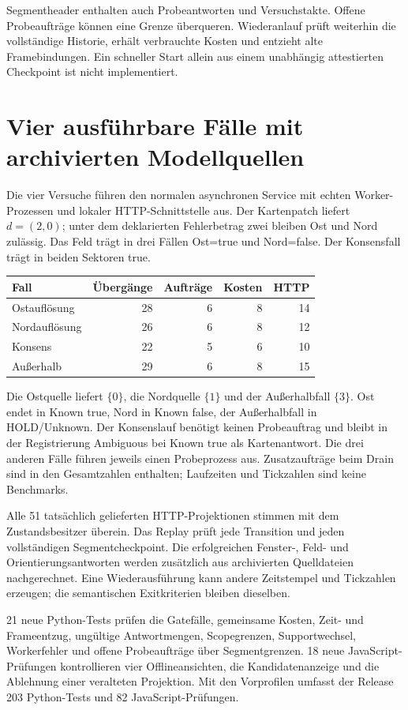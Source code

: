 \documentclass[11pt,a4paper]{article}
\newcommand{\nextsection}[2]{\clearpage{\color{accent}\small\textsf{#1}}\section{#2}}
\begin{document}
Segmentheader enthalten auch Probeantworten und Versuchstakte.
Offene Probeaufträge können eine Grenze überqueren. Wiederanlauf
prüft weiterhin die vollständige Historie, erhält verbrauchte Kosten
und entzieht alte Framebindungen. Ein schneller Start allein aus
einem unabhängig attestierten Checkpoint ist nicht implementiert.

\nextsection{49 / NACHWEIS}{Vier ausführbare Fälle mit archivierten Modellquellen}
Die vier Versuche führen den normalen asynchronen Service mit echten
Worker-Prozessen und lokaler HTTP-Schnittstelle aus. Der Kartenpatch
liefert $d=(2,0)$; unter dem deklarierten Fehlerbetrag zwei bleiben
Ost und Nord zulässig. Das Feld trägt in drei Fällen Ost=true und
Nord=false. Der Konsensfall trägt in beiden Sektoren true.

\begin{center}\begin{tabular}{@{}lrrrr@{}}\toprule
Fall & Übergänge & Aufträge & Kosten & HTTP\\\midrule
Ostauflösung & 28 & 6 & 8 & 14\\
Nordauflösung & 26 & 6 & 8 & 12\\
Konsens & 22 & 5 & 6 & 10\\
Außerhalb & 29 & 6 & 8 & 15\\\bottomrule
\end{tabular}\end{center}

Die Ostquelle liefert $\{0\}$, die Nordquelle $\{1\}$ und der
Außerhalbfall $\{3\}$. Ost endet in Known true, Nord in Known false,
der Außerhalbfall in HOLD/Unknown. Der Konsenslauf benötigt keinen
Probeauftrag und bleibt in der Registrierung Ambiguous bei
Known true als Kartenantwort. Die drei anderen Fälle führen jeweils
einen Probeprozess aus. Zusatzaufträge beim Drain sind in den
Gesamtzahlen enthalten; Laufzeiten und Tickzahlen sind keine Benchmarks.

Alle 51 tatsächlich gelieferten HTTP-Projektionen stimmen mit dem
Zustandsbesitzer überein. Das Replay prüft jede Transition und jeden
vollständigen Segmentcheckpoint. Die erfolgreichen Fenster-, Feld-
und Orientierungsantworten werden zusätzlich aus archivierten
Quelldateien nachgerechnet. Eine Wiederausführung kann andere
Zeitstempel und Tickzahlen erzeugen; die semantischen Exitkriterien
bleiben dieselben.

21 neue Python-Tests prüfen die Gatefälle, gemeinsame Kosten,
Zeit- und Frameentzug, ungültige Antwortmengen, Scopegrenzen,
Supportwechsel, Workerfehler und offene Probeaufträge über
Segmentgrenzen. 18 neue JavaScript-Prüfungen kontrollieren vier
Offlineansichten, die Kandidatenanzeige und die Ablehnung einer
veralteten Projektion. Mit den Vorprofilen umfasst der Release
203 Python-Tests und 82 JavaScript-Prüfungen.
\end{document}
